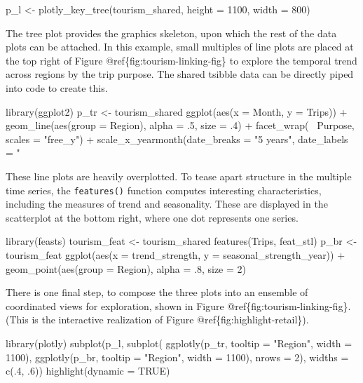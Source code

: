 \begin{Schunk}
\begin{Sinput}
p_l <- plotly_key_tree(tourism_shared, height = 1100, width = 800)
\end{Sinput}
\end{Schunk}

The tree plot provides the graphics skeleton, upon which the rest of the
data plots can be attached. In this example, small multiples of line
plots are placed at the top right of Figure
@ref\{fig:tourism-linking-fig\} to explore the temporal trend across
regions by the trip purpose. The shared tsibble data can be directly
piped into  code to create this.

\begin{Schunk}
\begin{Sinput}
library(ggplot2)
p_tr <- tourism_shared %
  ggplot(aes(x = Month, y = Trips)) +
  geom_line(aes(group = Region), alpha = .5, size = .4) +
  facet_wrap(~ Purpose, scales = "free_y") +
  scale_x_yearmonth(date_breaks = "5 years", date_labels = "%
\end{Sinput}
\end{Schunk}

These line plots are heavily overplotted. To tease apart structure in
the multiple time series, the \texttt{features()} function computes
interesting characteristics, including the measures of trend and
seasonality. These are displayed in the scatterplot at the bottom right,
where one dot represents one series.

\begin{Schunk}
\begin{Sinput}
library(feasts)
tourism_feat <- tourism_shared %
  features(Trips, feat_stl)
p_br <- tourism_feat %
  ggplot(aes(x = trend_strength, y = seasonal_strength_year)) +
  geom_point(aes(group = Region), alpha = .8, size = 2)
\end{Sinput}
\end{Schunk}

There is one final step, to compose the three plots into an ensemble of
coordinated views for exploration, shown in Figure
@ref\{fig:tourism-linking-fig\}. (This is the interactive realization of
Figure @ref\{fig:highlight-retail\}).

\begin{Schunk}
\begin{Sinput}
library(plotly)
subplot(p_l,
  subplot(
    ggplotly(p_tr, tooltip = "Region", width = 1100),
    ggplotly(p_br, tooltip = "Region", width = 1100),
    nrows = 2),
  widths = c(.4, .6)) %
  highlight(dynamic = TRUE)
\end{Sinput}
\end{Schunk}

